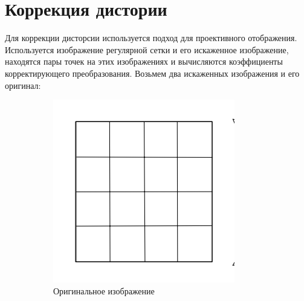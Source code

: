 \documentclass[a4paper, 16pt]{article}
\begin{document}
\section{Коррекция дистории}
\noindent Для коррекции дисторсии используется подход
для проективного отображения. Используется изображение
регулярной сетки и его искаженное изображение, находятся
пары точек на этих изображениях и вычисляются коэффициенты
корректирующего преобразования. Возьмем два искаженных изображения
и его оригинал:
\begin{figure}[!htb]
    \centering
    \begin{subfigure}[b]{0.3\textwidth}
        \centering
        \includegraphics[width=\textwidth]{orig.png}
        \caption{Оригинальное изображение}
        \label{fig:original}
    \end{subfigure}
    \hfill
    \begin{subfigure}[b]{0.3\textwidth}
        \centering

\end{subfigure}
\end{figure}
\end{document}
